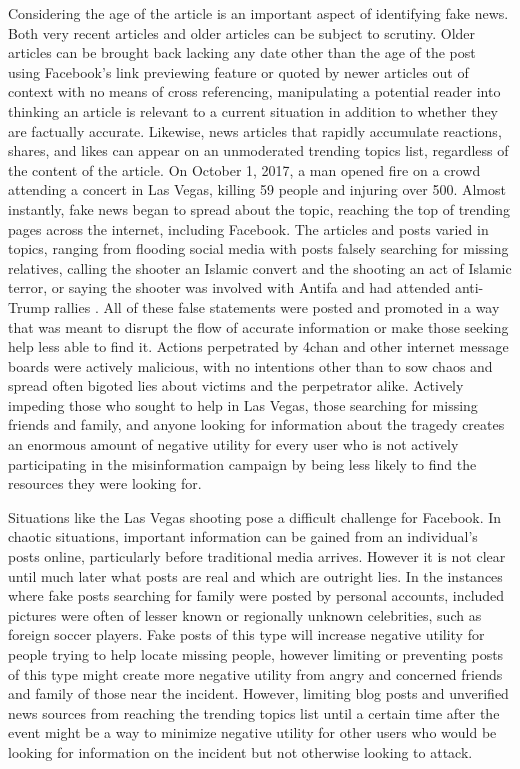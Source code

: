 \documentclass[12pt]{article}
\begin{document}
Considering the age of the article is an important aspect of identifying fake news. Both very recent articles and older articles can be subject to scrutiny. Older articles can be brought back lacking any date other than the age of the post using Facebook's link previewing feature or quoted by newer articles out of context with no means of cross referencing, manipulating a potential reader into thinking an article is relevant to a current situation in addition to whether they are factually accurate. Likewise, news articles that rapidly accumulate reactions, shares, and likes can appear on an unmoderated trending topics list, regardless of the content of the article. On October 1, 2017, a man opened fire on a crowd attending a concert in Las Vegas, killing 59 people and injuring over 500. Almost instantly, fake news began to spread about the topic, reaching the top of trending pages across the internet, including Facebook. The articles and posts varied in topics, ranging from flooding social media with posts falsely searching for missing relatives, calling the shooter an Islamic convert and the shooting an act of Islamic terror, or saying the shooter was involved with Antifa and had attended anti-Trump rallies \citep{buzzfeed_vegas_conspiracies}. All of these false statements were posted and promoted in a way that was meant to disrupt the flow of accurate information or make those seeking help less able to find it. Actions perpetrated by 4chan and other internet message boards were actively malicious, with no intentions other than to sow chaos and spread often bigoted lies about victims and the perpetrator alike. Actively impeding those who sought to help in Las Vegas, those searching for missing friends and family, and anyone looking for information about the tragedy creates an enormous amount of negative utility for every user who is not actively participating in the misinformation campaign by being less likely to find the resources they were looking for.

Situations like the Las Vegas shooting pose a difficult challenge for Facebook. In chaotic situations, important information can be gained from an individual's posts online, particularly before traditional media arrives. However it is not clear until much later what posts are real and which are outright lies. In the instances where fake posts searching for family were posted by personal accounts, included pictures were often of lesser known or regionally unknown celebrities, such as foreign soccer players. Fake posts of this type will increase negative utility for people trying to help locate missing people, however limiting or preventing posts of this type might create more negative utility from angry and concerned friends and family of those near the incident. However, limiting blog posts and unverified news sources from reaching the trending topics list until a certain time after the event might be a way to minimize negative utility for other users who would be looking for information on the incident but not otherwise looking to attack.
\end{document}
